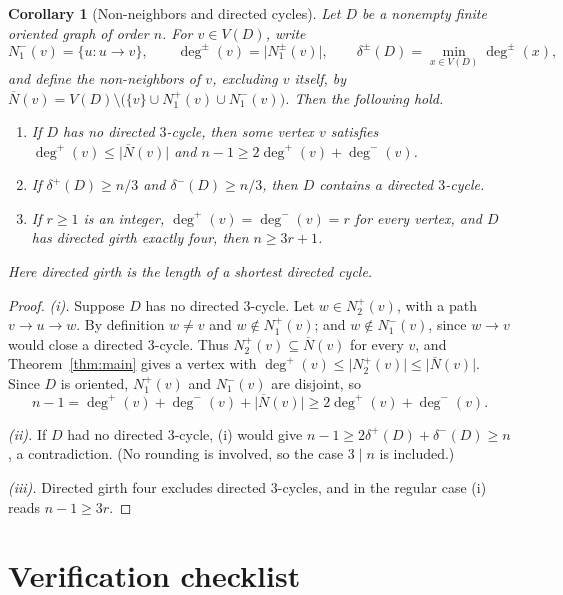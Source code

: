 \documentclass[11pt]{article}
\newtheorem{corollary}[theorem]{Corollary}
\theoremstyle{remark}
\newcommand{\abs}[1]{\lvert #1\rvert}
\begin{document}
\begin{corollary}[Non-neighbors and directed cycles]\label{cor:directed-cycle-consequences}
Let \(D\) be a nonempty finite oriented graph of order \(n\). For
\(v\in V(D)\), write
\[
 N_1^-(v)=\{u:u\to v\},\qquad
 \deg^\pm(v)=\abs{N_1^\pm(v)},\qquad
 \delta^\pm(D)=\min_{x\in V(D)}\deg^\pm(x),
\]
and define the non-neighbors of \(v\), excluding \(v\) itself, by
\(\overline N(v)=V(D)\setminus\bigl(\{v\}\cup N_1^+(v)\cup N_1^-(v)\bigr)\).
Then the following hold.
\begin{enumerate}[label=\textup{(\roman*)}]
\item If \(D\) has no directed \(3\)-cycle, then some vertex \(v\) satisfies
\(\deg^+(v)\leq\abs{\overline N(v)}\) and
\(n-1\geq2\deg^+(v)+\deg^-(v)\).
\item If \(\delta^+(D)\geq n/3\) and \(\delta^-(D)\geq n/3\), then \(D\)
contains a directed \(3\)-cycle.
\item If \(r\geq1\) is an integer, \(\deg^+(v)=\deg^-(v)=r\) for every vertex,
and \(D\) has directed girth exactly four, then \(n\geq3r+1\).
\end{enumerate}
Here directed girth is the length of a shortest directed cycle.
\end{corollary}

\begin{proof}
\emph{(i).} Suppose \(D\) has no directed \(3\)-cycle. Let \(w\in N_2^+(v)\),
with a path \(v\to u\to w\). By definition \(w\ne v\) and
\(w\notin N_1^+(v)\); and \(w\notin N_1^-(v)\), since \(w\to v\) would close a
directed \(3\)-cycle. Thus \(N_2^+(v)\subseteq\overline N(v)\) for every
\(v\), and Theorem~\ref{thm:main} gives a vertex with
\(\deg^+(v)\leq\abs{N_2^+(v)}\leq\abs{\overline N(v)}\). Since \(D\) is
oriented, \(N_1^+(v)\) and \(N_1^-(v)\) are disjoint, so
\[
 n-1=\deg^+(v)+\deg^-(v)+\abs{\overline N(v)}\geq2\deg^+(v)+\deg^-(v).
\]

\emph{(ii).} If \(D\) had no directed \(3\)-cycle, \textup{(i)} would give
\(n-1\geq2\delta^+(D)+\delta^-(D)\geq n\), a contradiction. (No rounding is
involved, so the case \(3\mid n\) is included.)

\emph{(iii).} Directed girth four excludes directed \(3\)-cycles, and in the
regular case \textup{(i)} reads \(n-1\geq3r\).
\end{proof}

\section*{Verification checklist}
\end{document}
